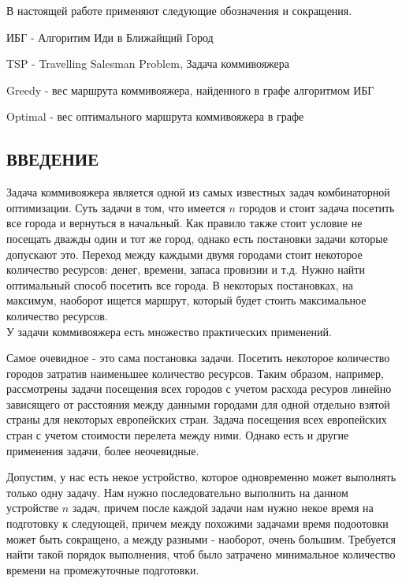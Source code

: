 \documentclass[a4paper, 14pt]{extarticle}
\numberwithin{equation}{section}
\begin{document}
В настоящей работе применяют следующие обозначения и сокращения.

ИБГ - Алгоритим Иди в Ближайщий Город

TSP - Travelling Salesman Problem, Задача коммивояжера

Greedy - вес маршрута коммивояжера, найденного в графе алгоритмом ИБГ

Optimal - вес оптимального маршрута коммивояжера в графе



\newpage

\begin{center}
\chapter{\textbf{ВВЕДЕНИЕ}}
\end{center}


Задача коммивояжера является одной из самых известных задач комбинаторной оптимизации. Суть задачи в том, что имеется $n$ городов и стоит задача посетить все города и вернуться в начальный. Как правило также стоит условие не посещать дважды один и тот же город, однако есть постановки задачи которые допускают это. Переход между каждыми двумя городами стоит некоторое количество ресурсов: денег, времени, запаса провизии и т.д. Нужно найти оптимальный способ посетить все города. В некоторых постановках, на максимум, наоборот ищется маршрут, который будет стоить максимальное количество ресурсов. \\


У задачи коммивояжера есть множество практических применений. 

Самое очевидное - это сама постановка задачи. Посетить некоторое количество городов затратив наименьшее количество ресурсов. Таким образом, например, рассмотрены задачи посещения всех городов с учетом расхода ресуров линейно зависящего от расстояния между данными городами для одной отдельно взятой страны для некоторых европейских стран. Задача посещения всех европейских стран с учетом стоимости перелета между ними. Однако есть и другие применения задачи, более неочевидные.

Допустим, у нас есть некое устройство, которое одновременно может выполнять только одну задачу.  Нам нужно последовательно выполнить на данном устройстве $n$ задач, причем после каждой задачи нам нужно некое время на подготовку к следующей, причем между похожими задачами время подоотовки может быть сокращено, а между разными - наоборот, очень большим. Требуется найти такой порядок выполнения, чтоб было затрачено минимальное количество времени на промежуточные подготовки.
\end{document}
